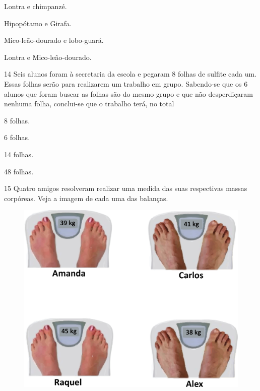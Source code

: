 \begin{multicols}{2}[\setlength{\columnsep}{-1cm}]
\begin{escolha}
\item
  Lontra e chimpanzé.
\item
  Hipopótamo e Girafa.
\item
  Mico-leão-dourado e lobo-guará.
\item
  Lontra e Mico-leão-dourado.
\end{escolha}
\end{multicols}


\num{14} Seis alunos foram à secretaria da escola e pegaram 8 folhas de sulfite cada um. Essas folhas serão para realizarem um trabalho em grupo. Sabendo-se que os 6 alunos que foram buscar as folhas são do mesmo grupo
e que não desperdiçaram nenhuma folha, conclui-se que o trabalho terá, no total

\begin{multicols}{2}
\begin{escolha}
\item
  8 folhas.
\item
  6 folhas.
\item
  14 folhas.
\item
  48 folhas.
\end{escolha}
\end{multicols}

\pagebreak

\num{15} Quatro amigos resolveram realizar uma medida das suas respectivas massas corpóreas. Veja a imagem de cada uma das balanças.

\begin{figure}[htpb!]
\centering
\includegraphics[width=.8\textwidth]{./media/image113.png}
\end{figure}

